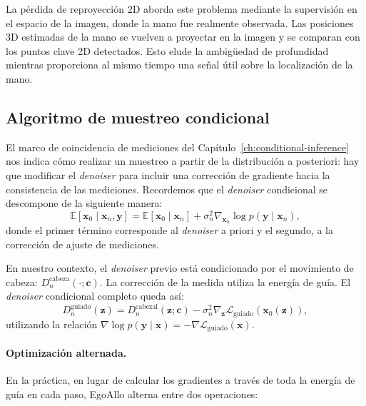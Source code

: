 \documentclass[../../book-main_es.tex]{subfiles}
\begin{document}
La pérdida de reproyección 2D aborda este problema mediante la supervisión en el espacio de la imagen,
donde la mano fue realmente observada. Las posiciones 3D estimadas de la mano
se vuelven a proyectar en la imagen y se comparan con los 
puntos clave 2D detectados. Esto elude la ambigüedad de profundidad mientras proporciona al mismo tiempo
una señal útil sobre la localización de la mano.

\subsection{Algoritmo de muestreo condicional}
\label{sub:egoallo_sampling}

El marco de coincidencia de mediciones del
Capítulo~\ref{ch:conditional-inference} nos indica cómo realizar un muestreo a partir
de la distribución a posteriori: hay que modificar el \textit{denoiser} para incluir una corrección de gradiente
hacia la consistencia de las mediciones. Recordemos que el \textit{denoiser} condicional
se descompone de la siguiente manera:
\begin{equation}
    \mathbb{E}[\boldsymbol{x}_0 \mid \boldsymbol{x}_n, \boldsymbol{y}]
    =
    \mathbb{E}[\boldsymbol{x}_0 \mid \boldsymbol{x}_n]
    +
    \sigma_n^2 \nabla_{\boldsymbol{x}_n} \log p(\boldsymbol{y} \mid \boldsymbol{x}_n),
\end{equation}
donde el primer término corresponde al \textit{denoiser} a priori y el segundo, a la
corrección de ajuste de mediciones.

En nuestro contexto, el \textit{denoiser} previo está condicionado por el movimiento de cabeza:
$D_n^{\text{cabeza}}(\cdot; \boldsymbol{c})$. La corrección de la medida utiliza 
la energía de guía. El \textit{denoiser} condicional completo queda así:
\begin{equation}
    D_n^{\text{guiado}}(\boldsymbol{z})
    =
    D_n^{\text{cabezal}}(\boldsymbol{z};\boldsymbol{c})
    -
    \sigma_n^2
    \nabla_{\boldsymbol{z}}
    \mathcal{L}_{\text{guiado}}(\boldsymbol{x}_0(\boldsymbol{z})),
\end{equation}
utilizando la relación $\nabla \log p(\boldsymbol{y} \mid \boldsymbol{x}) =
-\nabla \mathcal{L}_{\text{guiado}}(\boldsymbol{x})$.

\paragraph{Optimización alternada.}
En la práctica, en lugar de calcular los gradientes a través de toda la
energía de guía en cada paso, EgoAllo alterna entre dos operaciones:
\end{document}
